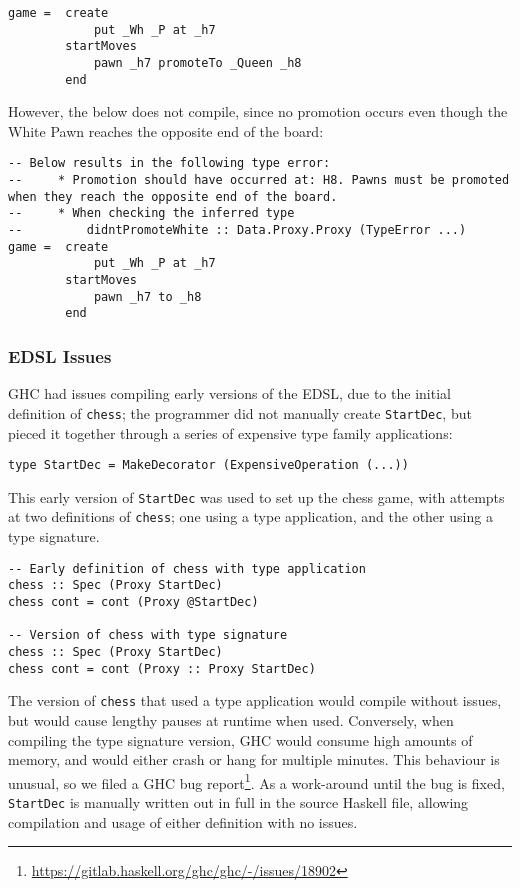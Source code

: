 \documentclass[12pt, a4paper, bibliography=totocnumbered]{scrartcl}
\begin{document}
\begin{lstlisting}
game =  create
            put _Wh _P at _h7
        startMoves
            pawn _h7 promoteTo _Queen _h8
        end
\end{lstlisting}

However, the below does not compile, since no promotion occurs even though the White Pawn reaches the opposite end of the board:

\begin{lstlisting}
-- Below results in the following type error:
--     * Promotion should have occurred at: H8. Pawns must be promoted when they reach the opposite end of the board.
--     * When checking the inferred type
--         didntPromoteWhite :: Data.Proxy.Proxy (TypeError ...)
game =  create
            put _Wh _P at _h7
        startMoves
            pawn _h7 to _h8
        end
\end{lstlisting}

\subsubsection{EDSL Issues}

GHC had issues compiling early versions of the EDSL, due to the initial definition of \lstinline{chess}; the programmer did not manually create \lstinline{StartDec}, but pieced it together through a series of expensive type family applications:

\begin{lstlisting}
type StartDec = MakeDecorator (ExpensiveOperation (...))
\end{lstlisting}

This early version of \lstinline{StartDec} was used to set up the chess game, with attempts at two definitions of \lstinline{chess}; one using a type application, and the other using a type signature.

\begin{lstlisting}
-- Early definition of chess with type application
chess :: Spec (Proxy StartDec)
chess cont = cont (Proxy @StartDec)

-- Version of chess with type signature
chess :: Spec (Proxy StartDec)
chess cont = cont (Proxy :: Proxy StartDec)
\end{lstlisting}

The version of \lstinline{chess} that used a type application would compile without issues, but would cause lengthy pauses at runtime when used. Conversely, when compiling the type signature version, GHC would consume high amounts of memory, and would either crash or hang for multiple minutes. This behaviour is unusual, so we filed a GHC bug report\footnote{\url{https://gitlab.haskell.org/ghc/ghc/-/issues/18902}}. As a work-around until the bug is fixed, \lstinline{StartDec} is manually written out in full in the source Haskell file, allowing compilation and usage of either definition with no issues.
\end{document}
